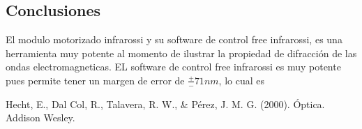 \documentclass[12]{article}
\begin{document}
\begin{multicols}{2}
\section{Conclusiones}
El modulo motorizado infrarossi y su software de control free infrarossi,  es una herramienta muy potente al momento de ilustrar la propiedad de difracción de las ondas electromagneticas.
EL software de control free infrarossi es muy potente pues permite tener un margen de error de $\frac{+}{-}71 nm$, lo cual es 

\begin{thebibliography}{99}

 Hecht, E., Dal Col, R., Talavera, R. W., \& Pérez, J. M. G. (2000). Óptica. Addison Wesley.
\end{thebibliography}
\end{multicols}
\end{document}
